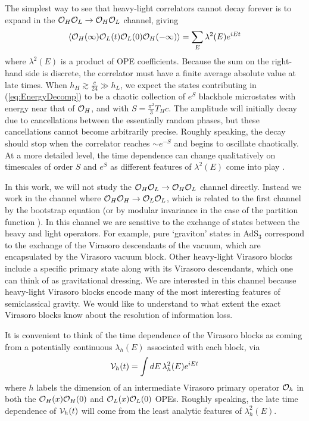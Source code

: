 \documentclass[12pt]{article}
\numberwithin{equation}{section}
\def\>{\rangle}
\def\<{\langle}
\newcommand{\be}{\begin{eqnarray}}
\newcommand{\ee}{\end{eqnarray}}
\newcommand{\CO}{{\cal O}}
\newcommand{\CV}{{\cal V}}
\begin{document}
The simplest way to see that heavy-light correlators cannot decay forever is to expand in the $\CO_H \CO_L \to \CO_H \CO_L$ channel, giving
\be \label{eq:EnergyDecomp}
\< \CO_H(\infty) \CO_L(t) \CO_L(0) \CO_H(-\infty) \> = \sum_E   \lambda^2(E) e^{i E t}
\ee
where $\lambda^2(E)$ is a product of OPE coefficients.  Because the sum on the right-hand side is discrete, the correlator must have a finite average absolute value at late times.
When $h_{H} \gtrsim \frac{c}{24} \gg h_{L}$, we expect the states contributing in (\ref{eq:EnergyDecomp}) to be a chaotic collection of $e^{S}$ blackhole microstates with energy near that of $\CO_{H}$, and with $S = \frac{\pi^2}{3} T_H c$. The amplitude will initially decay  due to cancellations between the essentially random phases, but  these cancellations cannot become arbitrarily precise.  Roughly speaking, the decay should stop when the correlator reaches $\sim e^{-S}$ and begins to oscillate chaotically.  At a more detailed level, the time dependence can change qualitatively on timescales of order $S$ and $e^S$ as different features of $\lambda^2(E)$ come into play \cite{Barbon:2014rma, Cotler:2016fpe, Dyer:2016pou, delCampo:2017bzr}.

In this work, we will not study the $\CO_H \CO_L \to \CO_H \CO_L$ channel directly.   Instead we work in the channel where $\CO_{H} \CO_{H} \to \CO_{L} \CO_{L}$, which is related to the first channel by the bootstrap equation (or by modular invariance in the case of the partition function \cite{Dyer:2016pou}).  In this channel we are sensitive to the exchange of states between the heavy and light operators.  For example, pure `graviton' states in AdS$_3$ correspond to the exchange of the Virasoro descendants of the vacuum, which are encapsulated by the Virasoro  vacuum block.  Other heavy-light Virasoro blocks include a specific primary state along with its Virasoro descendants, which one can think of as gravitational dressing.  We are interested in this channel because heavy-light Virasoro blocks encode many of the most interesting features of semiclassical gravity.  We would like to understand to what extent the exact Virasoro blocks know about the resolution of information loss.

It is convenient to think of the time dependence of the Virasoro blocks as coming from a potentially continuous $\lambda_h(E)$ associated with each block, via
\be \label{eq:VasEIntegral}
\CV_h(t) = \int dE \, \lambda^2_h(E) e^{i E t}
\ee
where $h$ labels the dimension of an intermediate Virasoro primary operator $\CO_h$  in both the $\CO_{H}(x) \CO_{H}(0)$ and  $\CO_{L}(x) \CO_{L}(0)$ OPEs.  Roughly speaking, the late time dependence of $\CV_h(t)$ will come from the least analytic features of $\lambda_h^2(E)$. 
\end{document}
